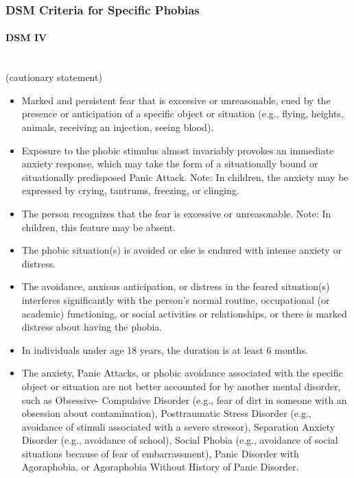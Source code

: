\documentclass[a4paper,10pt]{article}
\begin{document}
\subsubsection{DSM Criteria for Specific Phobias}
\paragraph{DSM IV}~\\
(cautionary statement) 
\begin{itemize}
\item Marked and persistent fear that is excessive or unreasonable, cued by the presence or anticipation of a specific object or situation (e.g., flying, heights, animals, receiving an
injection, seeing blood). 
\item Exposure to the phobic stimulus almost invariably provokes an immediate anxiety response, which may take the form of a situationally bound or situationally predisposed Panic Attack. 
Note: In children, the anxiety may be expressed by crying, tantrums, freezing, or clinging. 
\item  The person recognizes that the fear is excessive or unreasonable. Note: In children, this feature may be absent. 
\item The phobic situation(s) is avoided or else is endured with intense anxiety or distress. 
\item The avoidance, anxious anticipation, or distress in the feared situation(s) interferes significantly with the person's normal routine, occupational (or academic) functioning, or
social activities or relationships, or there is marked distress about having the phobia. 
\item In individuals under age 18 years, the duration is at least 6 months.
\item The anxiety, Panic Attacks, or phobic avoidance associated with the specific object or situation are not better accounted for by another mental disorder, such as Obsessive-
Compulsive Disorder (e.g., fear of dirt in someone with an obsession about contamination), Posttraumatic Stress Disorder (e.g., avoidance of stimuli associated with a severe stressor),
Separation Anxiety Disorder (e.g., avoidance of school), Social Phobia (e.g., avoidance of social situations because of fear of embarrassment), Panic Disorder with Agoraphobia, or 
Agoraphobia Without History of Panic Disorder. \cite{dsmPhobia}
\end{itemize}
\end{document}
